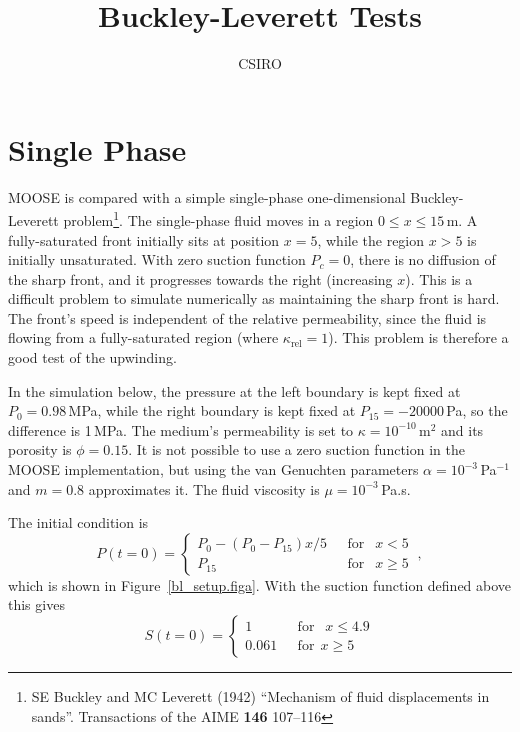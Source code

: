 \documentclass[]{report}
\begin{document}
\title{Buckley-Leverett Tests}
\author{CSIRO}
\maketitle

\tableofcontents

\chapter{Single Phase}


MOOSE is compared with a simple single-phase one-dimensional
Buckley-Leverett problem\footnote{SE Buckley and MC Leverett (1942)
  ``Mechanism of fluid displacements in sands''.  Transactions of the
  AIME {\bf 146} 107--116}.  The single-phase fluid moves in a region
$0\leq x\leq 15$\,m.  A fully-saturated front initially sits at
position $x=5$, while the region $x>5$ is initially unsaturated.  With
zero suction function $P_{c} = 0$, there is no diffusion of the sharp
front, and it progresses towards the right (increasing $x$).  This is
a difficult problem to simulate numerically as maintaining the sharp
front is hard.  The front's speed is independent of the relative
permeability, since the fluid is flowing from a fully-saturated region
(where $\kappa_{\mathrm{rel}}=1$).  This problem is therefore a good
test of the upwinding.

In the simulation below, the pressure at the left boundary is kept
fixed at $P_{0}=0.98$\,MPa, while the right boundary is kept fixed at
$P_{15}=-20000$\,Pa, so the difference is 1\,MPa.  The medium's
permeability is set to $\kappa = 10^{-10}\,\mathrm{m}^{2}$ and its
porosity is $\phi = 0.15$.  It is not possible to use a zero suction
function in the MOOSE implementation, but using the van Genuchten
parameters $\alpha = 10^{-3}$\,Pa$^{-1}$ and $m=0.8$ approximates it.
The fluid viscosity is $\mu = 10^{-3}$\,Pa.s.

The initial condition is
\begin{equation}
P(t=0) = \left\{
\begin{array}{ll}
P_{0} - (P_{0}-P_{15})x/5 & \ \ \ \mbox{for }\ \ x<5 \\
P_{15} & \ \ \ \mbox{for }\ \ x\geq 5
\end{array}
\right. \ ,
\end{equation}
which is shown in
Figure~\ref{bl_setup.figa}.  With the suction function defined above
this gives
\begin{equation}
S(t=0) = \left\{
\begin{array}{ll}
1 & \ \ \ \mbox{for }\ \ x\leq 4.9 \\
0.061 & \ \ \ \mbox{for} \ \ x \geq 5
\end{array}
\right.
\end{equation}
\end{document}
